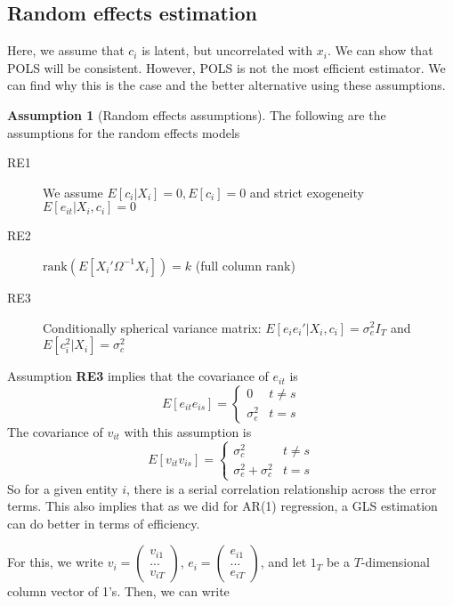 \documentclass[12pt]{article}
\theoremstyle{definition}
\theoremstyle{property}
\theoremstyle{assumption}
\newtheorem{assumption}{Assumption}[section]
\theoremstyle{example}
\theoremstyle{comment}
\begin{document}
\subsection{Random effects estimation}
Here, we assume that $c_i$ is latent, but uncorrelated with $x_i$. We can show that POLS will be consistent. However, POLS is not the most efficient estimator. We can find why this is the case and the better alternative using these assumptions. 
\begin{mdframed}[backgroundcolor=blue!5] 
\begin{assumption}[Random effects assumptions]
The following are the assumptions for the random effects models
\begin{description}
\item[RE1] We assume $E[c_i|X_i]=0, E[c_i]=0$ and strict exogeneity $E[e_{it}|X_i,c_i]=0$
\item[RE2] $\text{rank}\left(E [X_i' \Omega^{-1}X_i]\right)=k$ (full column rank)
\item[RE3] Conditionally spherical variance matrix: $E[e_ie_i'|X_i,c_i]=\sigma_e^2 I_T$ and $E[c_i^2|X_i]=\sigma_c^2$
\end{description}
\end{assumption}
\end{mdframed}
Assumption \textbf{RE3} implies that the covariance of $e_{it}$ is
\[
E[e_{it}e_{is}]=\begin{cases} 0 & t\neq s \\ \sigma_e^2 & t=s \end{cases}
\]
The covariance of $v_{it}$ with this assumption is
\[
E[v_{it}v_{is}]=\begin{cases} \sigma_c^2 & t\neq s \\ \sigma_e^2+\sigma_c^2 & t=s \end{cases}
\]
So for a given entity $i$, there is a serial correlation relationship across the error terms. This also implies that as we did for AR(1) regression, a GLS estimation can do better in terms of efficiency. 
\par
For this, we write $v_i = \begin{pmatrix}v_{i1} \\ ... \\ v_{iT} \end{pmatrix}$, $e_i = \begin{pmatrix}e_{i1} \\ ... \\ e_{iT} \end{pmatrix}$, and let $1_T$ be a $T$-dimensional column vector of 1's. Then, we can write
\end{document}
